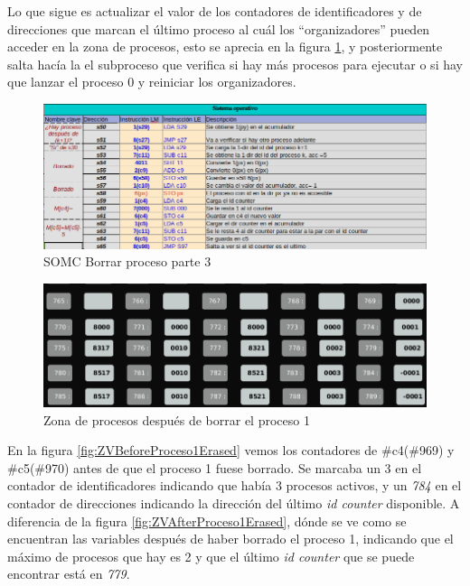 \documentclass[letterpaper,12pt,oneside]{book}
\begin{document}
		
		Lo que sigue es actualizar el valor de los contadores de identificadores y de direcciones que marcan
		el último proceso  al cuál los ``organizadores'' pueden acceder en la zona de procesos, esto se aprecia
		en la figura \ref{fig:somcBorrar3}, y posteriormente salta hacía la el subproceso que
		verifica si hay más procesos para ejecutar o si hay que lanzar el proceso 0 y reiniciar los organizadores.
		
		\begin{figure}[h]		
			\centering
			\includegraphics[scale=0.53]{media/CARDIACC/SO_Borrar3.png}
			\caption{ SOMC Borrar proceso parte 3 }
			\label{fig:somcBorrar3}
		\end{figure}		
		
		\begin{figure}[h]		
			\centering
			\includegraphics[scale=0.45]{media/CARDIACC/ZPAfterProceso1Borrado.png}
			\caption{ Zona de procesos después de borrar el proceso 1}
			\label{fig:ZPAfterProceso1Borrado}
		\end{figure}
		
		En la figura \ref{fig:ZVBeforeProceso1Erased} vemos los contadores de \#c4(\#969) y \#c5(\#970) antes de que el proceso 1 fuese borrado.
		Se marcaba un 3 en el contador de identificadores indicando que había 3 procesos activos,  y un \textit{784} en el contador de direcciones 
		indicando la dirección del último \textit{id counter} disponible. A diferencia de la figura \ref{fig:ZVAfterProceso1Erased}, dónde se ve como 
		se encuentran las variables después de haber borrado el proceso 1, indicando que el máximo de procesos que hay es 2 y que  el último \textit{id 
		counter} que se puede encontrar está en \textit{779}.
		
\end{document}

